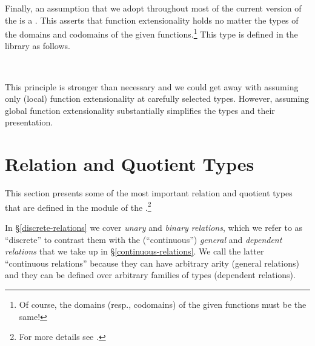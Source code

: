\documentclass[a4paper,UKenglish,cleveref,autoref,thm-restate,11pt]{lipics-v2021}
\begin{document}
Finally, an assumption that we adopt throughout most of the current version of the \ualib is a . This asserts that function extensionality holds no matter the types of the domains and codomains of the given functions.\footnote{Of course, the domains (resp., codomains) of the given functions must be the same!} This type is defined in the \typetopology library as follows.
\ccpad
\begin{code}
\>[0]\AgdaSpace{}%
\AgdaSymbol{:}\AgdaSpace{}%
\<%
\\
\>[0]\AgdaSpace{}%
\AgdaSymbol{=}\AgdaSpace{}%
\AgdaSpace{}%
\AgdaSymbol{\{}\AgdaSpace{}%
\AgdaSymbol{\}}\AgdaSpace{}%
\AgdaSpace{}%
\AgdaSpace{}%
\AgdaSpace{}%
\<%
\end{code}
\ccpad
This principle is stronger than necessary and we could get away with assuming only (local) function extensionality at carefully selected types. However, assuming global function extensionality substantially simplifies the types and their presentation.



\section{Relation and Quotient Types}\label{sec:relations}

This section presents some of the most important relation and quotient types that are defined in the \ualibRelations module of the \agdaualib.\footnote{For more details see \urlRelations.}

In \S\ref{discrete-relations} we cover \emph{unary} and \emph{binary relations}, which we refer to as ``discrete'' to contrast them with the (``continuous'') \emph{general} and \emph{dependent relations} that we take up in \S\ref{continuous-relations}. We call the latter ``continuous relations'' because they can have arbitrary arity (general relations) and they can be defined over arbitrary families of types (dependent relations).
\end{document}
